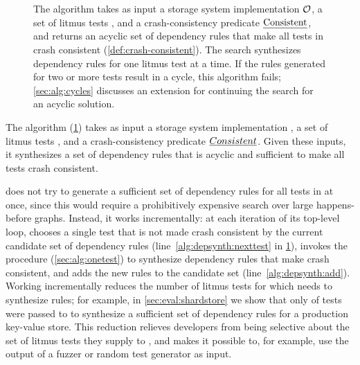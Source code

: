 \begin{figure}
    \centering
    {}
    \caption{The \depsynth algorithm takes as input a storage system implementation $\mathcal{O}$,
    a set of litmus tests \tests, and a crash-consistency predicate $\textrm{\emph{Consistent}}$,
    and returns an acyclic set of dependency rules that make all tests in \tests crash consistent (\cref{def:crash-consistent}).
    The search synthesizes dependency rules for one litmus test at a time.
    If the rules generated for two or more tests result in a cycle,
    this algorithm fails; \cref{sec:alg:cycles} discusses an extension for continuing 
    the search for an acyclic solution.}
    \label{fig:alg:depsynth}
\end{figure}

The \depsynthalg algorithm (\cref{fig:alg:depsynth})
takes as input a storage system implementation \sys,
a set of litmus tests \tests,
and a crash-consistency predicate $\emph{Consistent}$.
Given these inputs,
it synthesizes a set of dependency rules
that is acyclic and sufficient to make all tests \tests crash consistent.

\depsynthalg does not try to generate a sufficient set of dependency rules
for all tests in \tests at once,
since this would require a prohibitively expensive search
over large happens-before graphs.
Instead, it works incrementally:
at each iteration of its top-level loop,
\depsynthalg chooses a single test \test that is not made crash consistent
by the current candidate set of dependency rules (line~\ref{alg:depsynth:nexttest} in \cref{fig:alg:depsynth}), 
invokes the procedure  (\cref{sec:alg:onetest})
to synthesize dependency rules that make \test crash consistent,
and adds the new rules to the candidate set (line~\ref{alg:depsynth:add}).
Working incrementally reduces the number of litmus tests
for which \depsynthalg needs to synthesize rules;
for example, in \cref{sec:eval:shardstore} we show that only \shardstoretestsused of \shardstoreinputtests tests
were passed to  to synthesize a sufficient set of dependency rules
for a production key-value store.
This reduction relieves developers from being selective about the set of litmus tests they supply to \depsynth,
and makes it possible to, for example, use the output of a fuzzer or random test generator as input.

